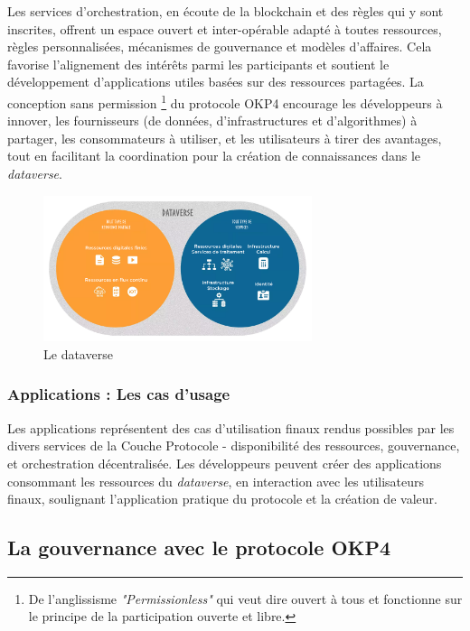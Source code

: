 Les services d'orchestration, en écoute de la blockchain et des règles qui y sont inscrites, offrent un espace ouvert et inter-opérable adapté à toutes ressources, règles personnalisées, mécanismes de gouvernance et modèles d'affaires. Cela favorise l'alignement des intérêts parmi les participants et soutient le développement d'applications utiles basées sur des ressources partagées. La conception sans permission \footnote{De l'anglissisme \textit{"Permissionless"} qui veut dire ouvert à tous et fonctionne sur le principe de la participation ouverte et libre.} du protocole OKP4 encourage les développeurs à innover, les fournisseurs (de données, d'infrastructures et d'algorithmes) à partager, les consommateurs à utiliser, et les utilisateurs à tirer des avantages, tout en facilitant la coordination pour la création de connaissances dans le \textit{dataverse}.

\begin{figure}[h]
    \centering
    \includegraphics[width=0.7\textwidth]{ILLUSTRATIONS/dataverse_1.png}
    \caption{Le dataverse}
    \label{fig:dataverse}
\end{figure}

\subsubsection{Applications : Les cas d'usage} \label{subsubsec:aperu_cas_d'usage}


Les applications représentent des cas d'utilisation finaux rendus possibles par les divers services de la Couche Protocole - disponibilité des ressources, gouvernance, et orchestration décentralisée. Les développeurs peuvent créer des applications consommant les ressources du \textit{dataverse}, en interaction avec les utilisateurs finaux, soulignant l'application pratique du protocole et la création de valeur.


\subsection{La gouvernance avec le protocole OKP4} \label{subsubsec:la_gouvernance_okp4}


